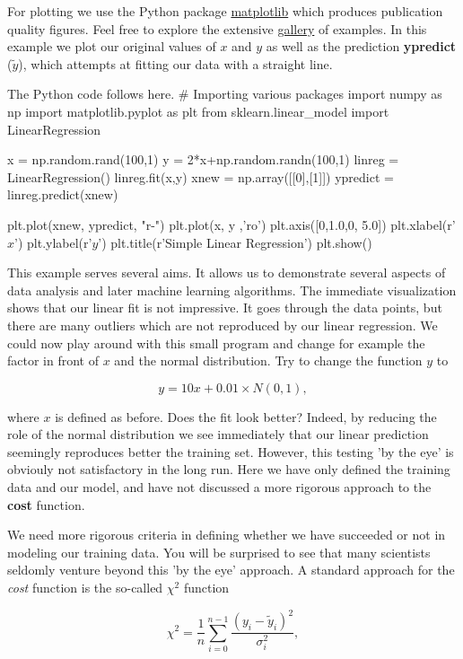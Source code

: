 \documentclass[%
oneside,                 %
final,                   %
10pt]{article}
\begin{document}
For plotting we use the Python package
\href{{https://matplotlib.org/}}{matplotlib} which produces publication
quality figures. Feel free to explore the extensive
\href{{https://matplotlib.org/gallery/index.html}}{gallery} of examples. In
this example we plot our original values of $x$ and $y$ as well as the
prediction \textbf{ypredict} ($\tilde{y}$), which attempts at fitting our
data with a straight line.

The Python code follows here.
\bpycod
# Importing various packages
import numpy as np
import matplotlib.pyplot as plt
from sklearn.linear_model import LinearRegression

x = np.random.rand(100,1)
y = 2*x+np.random.randn(100,1)
linreg = LinearRegression()
linreg.fit(x,y)
xnew = np.array([[0],[1]])
ypredict = linreg.predict(xnew)

plt.plot(xnew, ypredict, "r-")
plt.plot(x, y ,'ro')
plt.axis([0,1.0,0, 5.0])
plt.xlabel(r'$x$')
plt.ylabel(r'$y$')
plt.title(r'Simple Linear Regression')
plt.show()
\epycod

This example serves several aims. It allows us to demonstrate several
aspects of data analysis and later machine learning algorithms. The
immediate visualization shows that our linear fit is not
impressive. It goes through the data points, but there are many
outliers which are not reproduced by our linear regression.  We could
now play around with this small program and change for example the
factor in front of $x$ and the normal distribution.  Try to change the
function $y$ to

\[
y = 10x+0.01 \times N(0,1),
\]

where $x$ is defined as before.  Does the fit look better? Indeed, by
reducing the role of the normal distribution we see immediately that
our linear prediction seemingly reproduces better the training
set. However, this testing 'by the eye' is obviouly not satisfactory in the
long run. Here we have only defined the training data and our model, and 
have not discussed a more rigorous approach to the \textbf{cost} function.

We need more rigorous criteria in defining whether we have succeeded or
not in modeling our training data.  You will be surprised to see that
many scientists seldomly venture beyond this 'by the eye' approach. A
standard approach for the \emph{cost} function is the so-called $\chi^2$
function 

\[ \chi^2 = \frac{1}{n}
\sum_{i=0}^{n-1}\frac{(y_i-\tilde{y}_i)^2}{\sigma_i^2}, 
\] 
\end{document}
